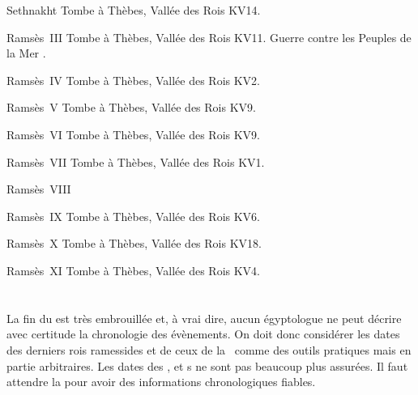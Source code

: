 \begin{listerois}
  \item [Sethnakht \datation{(c.~1185-1183)}] 
        Tombe à Thèbes, Vallée des Rois KV14. 
  \item [Ramsès~III \datation{(c.~1183-1152)}] 
        Tombe à Thèbes, Vallée des Rois KV11. 
        Guerre contre les \fg Peuples de la Mer \fg.
  \item [Ramsès~IV \datation{(c.~1152-1145)}] 
        Tombe à Thèbes, Vallée des Rois KV2. 
  \item [Ramsès~V \datation{(c.~1145-1142)}] 
        Tombe à Thèbes, Vallée des Rois KV9. 
  \item [Ramsès~VI \datation{(c.~1142-1134)}] 
        Tombe à Thèbes, Vallée des Rois KV9. 
  \item [Ramsès~VII \datation{(c.~1134-1126)}] 
        Tombe à Thèbes, Vallée des Rois KV1. 
  \item [Ramsès~VIII \datation{(c.~1126-1125)}] 
  \item [Ramsès~IX \datation{(c.~1125-1107)}] 
        Tombe à Thèbes, Vallée des Rois KV6. 
  \item [Ramsès~X \datation{(c.~1107-1099)}] 
        Tombe à Thèbes, Vallée des Rois KV18. 
  \item [Ramsès~XI \datation{(c.~1099-1069)}] 
        Tombe à Thèbes, Vallée des Rois KV4. 
\end{listerois}

\section{\TPI}

La fin du \NK est très embrouillée et, à vrai dire, aucun égyptologue 
ne peut décrire avec certitude la chronologie des évènements. On doit 
donc considérer les dates des derniers rois ramessides et de ceux de 
la~ comme des outils pratiques mais en partie arbitraires. 
Les dates des \ieme, \ieme et s ne sont 
pas beaucoup plus assurées. Il faut attendre la  pour avoir 
des informations chronologiques fiables.

\subsection{\texorpdfstring{}{XXIe dynastie}}


